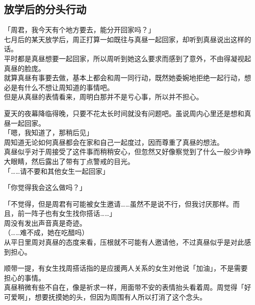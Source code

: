 \subsection{放学后的分头行动}

「周君，我今天有个地方要去，能分开回家吗？」\\

七月后的某天放学后，周正打算一如既往与真昼一起回家，却听到真昼说出这样的话。\\

平时都是真昼想要一起回家，所以周听到她这么要求而感到了意外，不由得凝视起真昼的脸庞。\\

就算真昼有事要去做，基本上都会和周一同行动，既然她委婉地拒绝一起行动，想必是有什么不想让周知道的事情吧。\\

但是从真昼的表情看来，周明白那并不是亏心事，所以并不担心。

夏天的夜幕降临得晚，只要不花太长时间就没有问题吧。虽说周内心里还是想和真昼一起回家。\\

「嗯，我知道了，那稍后见」\\

周知道无论如何真昼都会在家和自己一起度过，因而尊重了真昼的想法。\\

真昼似乎对于周接受了这件事而稍稍安心，但忽然又好像察觉到了什么一般少许睁大眼睛，然后露出了带有丁点警戒的目光。\\

「……请不要和其他女生一起回家」

「你觉得我会这么做吗？」

「不觉得，但是周君有可能被女生邀请……虽然不是说不行，但我讨厌那样。而且，前一阵子也有女生找你搭话……」\\

周没有发出声音真是奇迹。\\

（……难不成，她在吃醋吗）\\

从平日里周对真昼的态度来看，压根就不可能有人邀请他，不过真昼似乎是对此感到担心。

顺带一提，有女生找周搭话指的是应援两人关系的女生对他说「加油」，不是需要担心的事情。\\

真昼稍微有些不自在，像是祈求一样，用面带不安的表情抬头看着周。周觉得「好可爱啊」，想要抚摸她的头，但因为周围有人所以打消了这个念头。\\

